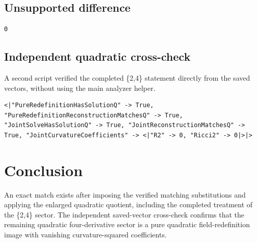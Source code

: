 \documentclass[11pt]{article}
\begin{document}
\subsection{Unsupported difference}
\begin{verbatim}
0
\end{verbatim}
\subsection{Independent quadratic cross-check}
A second script verified the completed \{2,4\} statement directly from the saved vectors, without using the main analyzer helper.
\begin{verbatim}
<|"PureRedefinitionHasSolutionQ" -> True, "PureRedefinitionReconstructionMatchesQ" -> True, "JointSolveHasSolutionQ" -> True, "JointReconstructionMatchesQ" -> True, "JointCurvatureCoefficients" -> <|"R2" -> 0, "Ricci2" -> 0|>|>
\end{verbatim}
\section{Conclusion}
An exact match exists after imposing the verified matching substitutions and applying the enlarged quadratic quotient, including the completed treatment of the \{2,4\} sector.
The independent saved-vector cross-check confirms that the remaining quadratic four-derivative sector is a pure quadratic field-redefinition image with vanishing curvature-squared coefficients.
\end{document}
